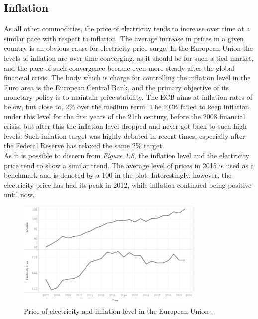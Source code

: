 \documentclass{book}
\begin{document}
\subsection{Inflation}

As all other commodities, the price of electricity tends to increase over time at a similar pace with respect to inflation. The average increase in prices in a given country is an obvious cause for electricity price surge. In the European Union the levels of inflation are over time converging, as it should be for such a tied market, and the pace of such convergence became even more steady after the global financial crisis. \cite{brovz2018dynamics} The body which is charge for controlling the inflation level in the Euro area is the European Central Bank, and the primary objective of its monetary policy is to maintain price stability. The ECB aims at inflation rates of below, but close to, 2\% over the medium term. The ECB failed to keep inflation under this level for the first years of the 21th century, before the 2008 financial crisis, but after this the inflation level dropped and never got back to such high levels. Such inflation target was highly debated in recent times, especially after the Federal Reserve has relaxed the same 2\% target.\\

As it is possible to discern from \textit{Figure 1.8}, the inflation level and the electricity price tend to show a similar trend. The average level of prices in 2015 is used as a benchmark and is denoted by a 100 in the plot. Interestingly, however, the electricity price has had its peak in 2012, while inflation continued being positive until now. 

\bigskip
\begin{figure}[H]
\begin{center}
\captionsetup{justification=centering}
\includegraphics[width=0.8\textwidth]{Images/inf.png}
\caption{Price of electricity and inflation level in the European Union . }
\end{center}
\end{figure}
\bigskip
\end{document}
